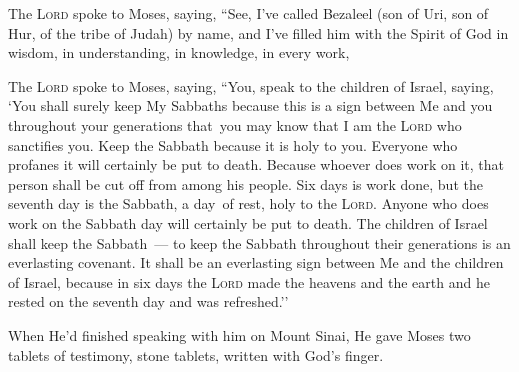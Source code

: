 
\begin{inparaenum}
     The \textsc{Lord} spoke to Moses, saying,%
     ``See, I've called Bezaleel (son of Uri, son of Hur, of the tribe of Judah) by name,%
     and I've filled him with the Spirit of God in wisdom, in understanding, in knowledge, in every work,%
    
     The \textsc{Lord} spoke to Moses, saying,%
     ``You, speak to the children of Israel, saying, `You shall surely keep My Sabbaths because this is a sign between Me and you throughout your generations that\understood\ you may know that I am the \textsc{Lord} who sanctifies you.%
     Keep the Sabbath because it is holy to you. Everyone who profanes it will certainly be put to death. Because whoever does work on it, that person shall be cut off from among his people.%
     Six days is work done, but the seventh day is the Sabbath, a day\understood\ of rest, holy to the \textsc{Lord}. Anyone who does work on the Sabbath day will certainly be put to death.%
     The children of Israel shall keep the Sabbath~--- to keep the Sabbath throughout their generations is an everlasting covenant.%
     It shall be an everlasting sign between Me and the children of Israel, because in six days the \textsc{Lord} made the heavens and the earth and he rested on the seventh day and was refreshed.''%
    
     When He'd finished speaking with him on Mount Sinai, He gave Moses two tablets of testimony, stone tablets, written with God's finger.%
\end{inparaenum}
